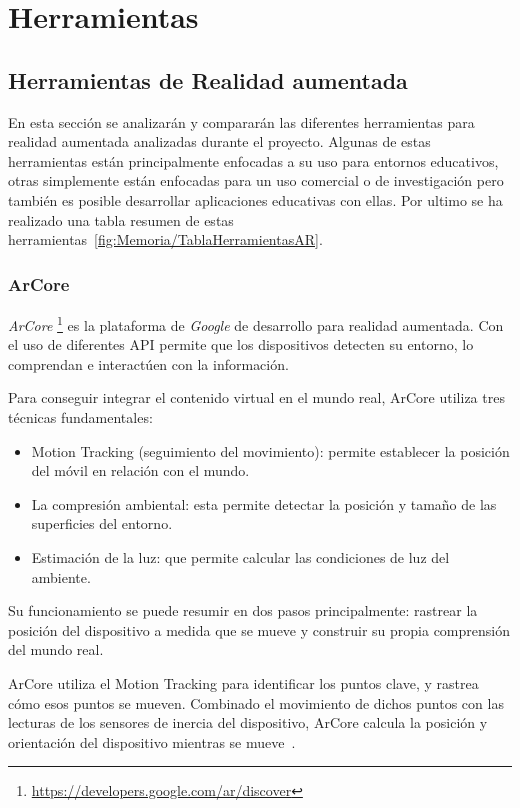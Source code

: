 
\section{Herramientas}
\subsection{Herramientas de Realidad aumentada}
En esta sección se analizarán y compararán las diferentes herramientas para realidad aumentada analizadas durante el proyecto. 
Algunas de estas herramientas están principalmente enfocadas a su uso para entornos educativos, otras simplemente están enfocadas para un uso comercial o de investigación pero también es posible desarrollar aplicaciones educativas con ellas. Por ultimo se ha realizado una tabla resumen de estas herramientas~\ref{fig:Memoria/TablaHerramientasAR}.


\subsubsection{ArCore}

\textit{ArCore} \footnote{\url{https://developers.google.com/ar/discover}} es la plataforma de \textit{Google} de desarrollo para realidad aumentada. Con el uso de diferentes API permite que los dispositivos detecten su entorno, lo comprendan e interactúen con la información.

Para conseguir integrar el contenido virtual en el mundo real, ArCore utiliza tres técnicas fundamentales:
\begin{itemize}
	\item Motion Tracking (seguimiento del movimiento): permite establecer la posición del móvil en relación con el mundo.
	\item La compresión ambiental: esta permite detectar la posición y tamaño de las superficies del entorno.
	\item Estimación de la luz: que permite calcular las condiciones de luz del ambiente.
\end{itemize}

Su funcionamiento se puede resumir en dos pasos principalmente: rastrear la posición del dispositivo a medida que se mueve y construir su propia comprensión del mundo real.

ArCore utiliza el Motion Tracking para identificar los puntos clave, y rastrea cómo esos puntos se mueven. Combinado el movimiento de dichos puntos con  las lecturas de los sensores de inercia del dispositivo, ArCore calcula la posición y orientación del dispositivo mientras se mueve~\cite{google}.

